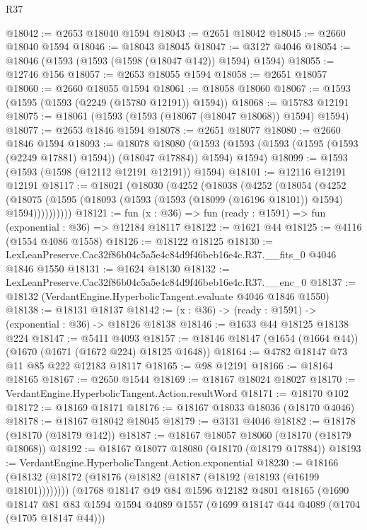 \begin{lexlean}{R37}
\begin{coremodule}
@18042 := @2653 @18040 @1594
@18043 := @2651 @18042
@18045 := @2660 @18040 @1594
@18046 := @18043 @18045
@18047 := @3127 @4046
@18054 := @18046 (@1593 (@1593 (@1598 (@18047 @142)) @1594) @1594)
@18055 := @12746 @156
@18057 := @2653 @18055 @1594
@18058 := @2651 @18057
@18060 := @2660 @18055 @1594
@18061 := @18058 @18060
@18067 := @1593 (@1595 (@1593 (@2249 (@15780 @12191)) @1594))
@18068 := @15783 @12191
@18075 := @18061 (@1593 (@1593 (@18067 (@18047 @18068)) @1594) @1594)
@18077 := @2653 @1846 @1594
@18078 := @2651 @18077
@18080 := @2660 @1846 @1594
@18093 := @18078
    @18080
    (@1593 (@1593 (@1593 (@1595 (@1593 (@2249 @17881) @1594)) (@18047 @17884)) @1594) @1594)
@18099 := @1593 (@1593 (@1598 (@12112 @12191 @12191)) @1594)
@18101 := @12116 @12191 @12191
@18117 := @18021
    (@18030
      (@4252
        (@18038
          (@4252
            (@18054
              (@4252
                (@18075 (@1595 (@18093 (@1593 (@1593 (@18099 (@16196 @18101)) @1594) @1594))))))))))
@18121 := fun (x : @36) => fun (ready : @1591) => fun (exponential : @36) => @12184 @18117
@18122 := @1621 @44
@18125 := @4116 (@1554 @4086 @1558)
@18126 := @18122 @18125
@18130 := LexLeanPreserve.Cac32f86b04c5a5e4c84d9f46beb16e4c.R37.__fits_0 @4046 @1846 @1550
@18131 := @1624 @18130
@18132 := LexLeanPreserve.Cac32f86b04c5a5e4c84d9f46beb16e4c.R37.__enc_0
@18137 := @18132 (VerdantEngine.HyperbolicTangent.evaluate @4046 @1846 @1550)
@18138 := @18131 @18137
@18142 := (x : @36) -> (ready : @1591) -> (exponential : @36) -> @18126 @18138
@18146 := @1633 @44 @18125 @18138 @224
@18147 := @5411 @4093
@18157 := @18146 @18147 (@1654 (@1664 @44)) (@1670 (@1671 (@1672 @224) @18125 @1648))
@18164 := @4782 @18147 @73 @11 @85 @222 @12183 @18117
@18165 := @98 @12191
@18166 := @18164 @18165
@18167 := @2650 @1544
@18169 := @18167 @18024 @18027
@18170 := VerdantEngine.HyperbolicTangent.Action.resultWord
@18171 := @18170 @102
@18172 := @18169 @18171
@18176 := @18167 @18033 @18036 (@18170 @4046)
@18178 := @18167 @18042 @18045
@18179 := @3131 @4046
@18182 := @18178 (@18170 (@18179 @142))
@18187 := @18167 @18057 @18060 (@18170 (@18179 @18068))
@18192 := @18167 @18077 @18080 (@18170 (@18179 @17884))
@18193 := VerdantEngine.HyperbolicTangent.Action.exponential
@18230 := @18166
    (@18132 (@18172 (@18176 (@18182 (@18187 (@18192 (@18193 (@16199 @18101))))))))
    (@1768
      @18147
      @49
      @84
      @1596
      @12182
      @4801
      @18165
      (@1690
        @18147
        @81
        @83
        @1594
        @1594
        @4089
        @1557
        (@1699 @18147 @44 @4089 (@1704 (@1705 @18147 @44)))

\end{coremodule}
\end{lexlean}
